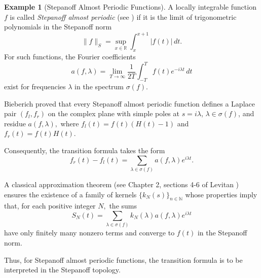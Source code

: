 \documentclass[12pt]{article}
\theoremstyle{definition}
\newtheorem{example}[theorem]{Example}
\begin{document}
\begin{example}[Stepanoff Almost Periodic Functions]\label{ex:almostperiodic}
A locally integrable function $f$ is called {\em Stepanoff almost periodic} (see \cite{Levitan})
if it is the limit of trigonometric polynomials in the Stepanoff norm
\[
\|f\|_S
=
\sup_{x\in\mathbb{R}}
\int_x^{x+1}|f(t)|\,dt.
\]
For such functions, the Fourier coefficients
\[
a(f,\lambda)
=
\lim_{T\to\infty}
\frac{1}{2T}
\int_{-T}^{T}
f(t)e^{-i\lambda t}\,dt
\]
exist for frequencies $\lambda$ in the spectrum $\sigma(f)$.

Bieberich \cite{Bieberich} proved that every Stepanoff almost periodic function defines a Laplace pair \((f_l, f_r)\) on the complex plane with simple poles at $s=i\lambda$, $\lambda\in\sigma(f)$, and residue $a(f,\lambda),$ where \(f_l(t)=f(t)(H(t)-1)\) and \(f_r(t)=f(t)H(t).\)

Consequently, the transition formula takes the form
\[
f_r(t)-f_l(t)
=
\sum_{\lambda\in\sigma(f)}
a(f,\lambda)e^{i\lambda t}.
\]
 
A classical approximation theorem (see Chapter 2, sections 4-6 of Levitan \cite{Levitan})  ensures the existence of a family of kernels \( \{k_N(s) \}_{n \in \mathbb{N}} \) whose properties imply that, for each positive integer $N,$ the sums
\[
S_N(t)
=
\sum_{\lambda\in\sigma(f)}
k_N(\lambda)
a(f,\lambda)e^{i\lambda t}
\]
have only finitely many nonzero terms and  converge to $f(t)$ in the Stepanoff norm.

Thus, for Stepanoff almost periodic functions, the transition formula is to be interpreted in the Stepanoff topology.

\end{example}
\end{document}
